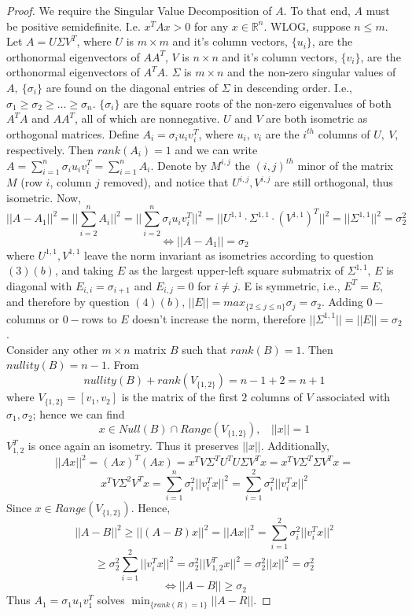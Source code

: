 \documentclass[11pt]{article}
\theoremstyle{quest}
\begin{document}
\begin{proof}
We require the Singular Value Decomposition of $A$. To that end, $A$ must be positive semidefinite. I.e. $x^TAx > 0$ for any $x \in \mathbb{R}^n$. WLOG, suppose $n \le m$. Let $A = U \Sigma V^T$, where $U$ is $m \times m$ and it's column vectors, $\{u_i\}$, are the orthonormal eigenvectors of $AA^T$, $V$ is $n \times n$ and it's column vectors, $\{v_i\}$, are the orthonormal eigenvectors of $A^TA$. $\Sigma$ is $m \times n$ and the non-zero singular values of $A,\ \{\sigma_i\}$ are found on the diagonal entries of $\Sigma$ in descending order. I.e., $\sigma_1 \ge \sigma_2 \ge \ldots \ge \sigma_n$. $\{\sigma_i\}$ are the square roots of the non-zero eigenvalues of both $A^TA$ and $AA^T$, all of which are nonnegative. $U$ and $V$ are both isometric as orthogonal matrices. Define $A_i = \sigma_i u_iv_i^T$, where $u_i$, $v_i$ are the $i^{th}$ columns of $U,\ V$, respectively. Then $rank(A_i) = 1$ and we can write $A = \sum_{i = 1}^n \sigma_i u_iv_i^T = \sum_{i = 1}^n A_i$. Denote by $M^{i,j}$ the $(i, j)^{th}$ minor of the matrix $M$ (row $i$, column $j$ removed), and notice that $U^{i,j}, V^{i,j}$ are still orthogonal, thus isometric. Now,
$$||A - A_1||^2 = ||\sum_{i=2}^n A_i||^2 = ||\sum_{i=2}^n \sigma_i u_i v_i^T||^2 = ||U^{1,1} \cdot \Sigma^{1,1} \cdot (V^{1,1})^T||^2 = ||\Sigma^{1,1}||^2 = \sigma_2^2$$
$$\iff ||A - A_1|| = \sigma_2$$
where $U^{1,1}, V^{1,1}$ leave the norm invariant as isometries according to question $(3)(b)$, and taking $E$ as the largest upper-left square submatrix of $\Sigma^{1,1}$, $E$ is diagonal with $E_{i,i} = \sigma_{i+1}$ and $E_{i,j} = 0$ for $i \ne j$. E is symmetric, i.e., $E^T=E$, and therefore by question $(4)(b)$, $||E|| = max_{\{2 \le j \le n\}} \sigma_j = \sigma_2$. Adding $0-$columns or $0-$rows to $E$ doesn't increase the norm, therefore $||\Sigma^{1,1}||=||E|| = \sigma_2$.
\\Consider any other $m \times n$ matrix $B$ such that $rank(B) = 1$. Then $nullity(B) = n-1$. From
$$nullity(B) + rank(V_{\{1,2\}}) = n - 1 + 2 = n+1$$
where $V_{\{1,2\}}=[v_1, v_2]$ is the matrix of the first $2$ columns of $V$ associated with $\sigma_1, \sigma_2$; hence we can find
$$x \in Null(B) \cap Range(V_{\{1,2\}}),\ \ \ \ ||x|| = 1$$
$V_{1,2}^T$ is once again an isometry. Thus it preserves $||x||$. Additionally,
$$||Ax||^2 = (Ax)^T(Ax) = x^T V \Sigma^T U^T U \Sigma V^T x = x^T V \Sigma^T \Sigma V^T x =$$
$$x^T V \Sigma^2 V^T x = \sum_{i=1}^n \sigma_i^2 ||v_i^T x||^2 = \sum_{i=1}^2 \sigma_i^2 ||v_i^T x||^2$$
Since $x \in Range(V_{\{1,2\}})$. Hence,
$$||A-B||^2 \ge ||(A-B)x||^2 = ||Ax||^2  = \sum_{i=1}^2 \sigma_i^2 ||v_i^T x||^2$$
$$\ge \sigma_2^2 \sum_{i=1}^2||v_i^T x||^2 = \sigma_2^2 ||V_{1,2}^Tx||^2 = \sigma_2^2 ||x||^2 = \sigma_2^2$$
$$\iff ||A-B|| \ge \sigma_2$$
Thus $A_1 = \sigma_1 u_1 v_1^T$ solves $ \min_{\{rank(R) = 1\}}||A-R||$.
\end{proof}
\end{document}
